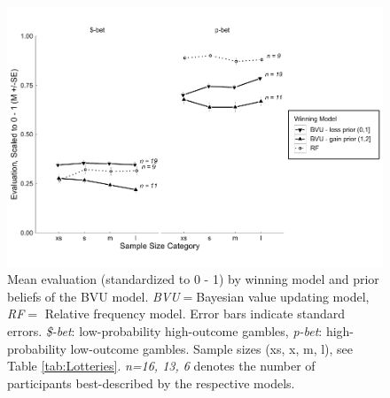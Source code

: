 \documentclass[a4paper, man, floatsintext]{apa6}
\begin{document}
\begin{figure}[H]

{\centering \includegraphics{../figures/qual1-1} 

}

\caption{Mean evaluation (standardized to 0 - 1) by winning model and prior beliefs of the BVU model. \textit{BVU}$=$Bayesian value updating model, \textit{RF}$=$ Relative frequency model. Error bars indicate standard errors. \textit{\$-bet}: low-probability high-outcome gambles, \textit{p-bet}: high-probability low-outcome gambles. Sample sizes (xs, x, m, l), see Table \ref{tab:Lotteries}. \textit{n=16, 13, 6} denotes the number of participants best-described by the respective models.}\label{fig:qual1}
\end{figure}
\end{document}
